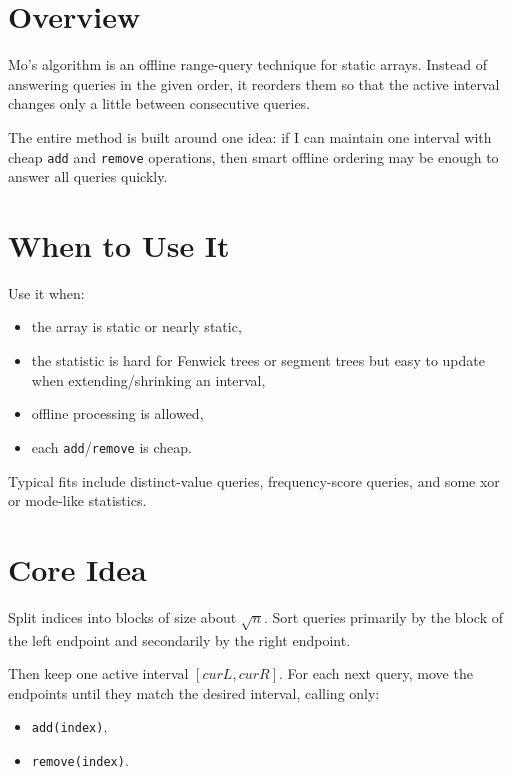 \section*{Overview}

Mo's algorithm is an offline range-query technique for static arrays. Instead of answering queries in the given order,
it reorders them so that the active interval changes only a little between consecutive queries.

The entire method is built around one idea: if I can maintain one interval with cheap \texttt{add} and
\texttt{remove} operations, then smart offline ordering may be enough to answer all queries quickly.

\section*{When to Use It}

Use it when:

\begin{itemize}
  \item the array is static or nearly static,
  \item the statistic is hard for Fenwick trees or segment trees but easy to update when extending/shrinking an
  interval,
  \item offline processing is allowed,
  \item each \texttt{add}/\texttt{remove} is cheap.
\end{itemize}

Typical fits include distinct-value queries, frequency-score queries, and some xor or mode-like statistics.

\section*{Core Idea}

Split indices into blocks of size about \(\sqrt{n}\). Sort queries primarily by the block of the left endpoint and
secondarily by the right endpoint.

Then keep one active interval \([curL, curR]\). For each next query, move the endpoints until they match the desired
interval, calling only:

\begin{itemize}
  \item \texttt{add(index)},
  \item \texttt{remove(index)}.
\end{itemize}

